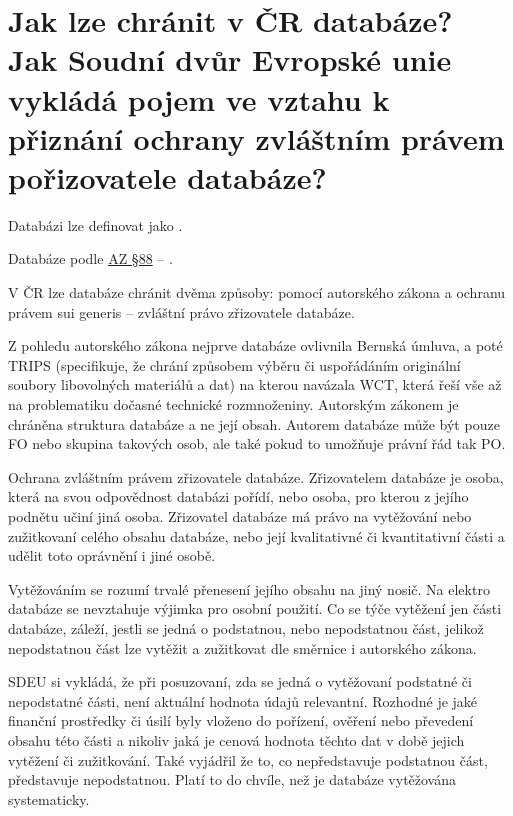 \section{Jak lze chránit v ČR databáze? Jak Soudní dvůr Evropské unie vykládá pojem  ve vztahu k přiznání ochrany zvláštním právem pořizovatele databáze?}

Databázi lze definovat jako .

Databáze podle \href{https://www.zakonyprolidi.cz/cs/2000-121#p88}{AZ §88} -- .

V ČR lze databáze chránit dvěma způsoby: pomocí autorského zákona a ochranu právem sui generis -- zvláštní právo zřizovatele databáze.

Z pohledu autorského zákona nejprve databáze ovlivnila Bernská úmluva, a poté TRIPS (specifikuje, že chrání způsobem výběru či uspořádáním originální soubory libovolných materiálů a dat) na kterou navázala WCT, která řeší vše až na problematiku dočasné technické rozmnoženiny. Autorským zákonem je chráněna struktura databáze a ne její obsah. Autorem databáze může být pouze FO nebo skupina takových osob, ale také pokud to umožňuje právní řád tak PO\@.

Ochrana zvláštním právem zřizovatele databáze. Zřizovatelem databáze je osoba, která na svou odpovědnost databázi pořídí, nebo osoba, pro kterou z jejího podnětu učiní jiná osoba. Zřizovatel databáze má právo na vytěžování nebo zužitkovaní celého obsahu databáze, nebo její kvalitativné či kvantitativní části a udělit toto oprávnění i jiné osobě. 

Vytěžováním se rozumí trvalé přenesení jejího obsahu na jiný nosič. Na elektro databáze se nevztahuje výjimka pro osobní použití. Co se týče vytěžení jen části databáze, záleží, jestli se jedná o podstatnou, nebo nepodstatnou část, jelikož nepodstatnou část lze vytěžit a zužitkovat dle směrnice i autorského zákona.

SDEU si vykládá, že při posuzovaní, zda se jedná o vytěžovaní podstatné či nepodstatné části, není aktuální hodnota údajů relevantní. Rozhodné je jaké finanční prostředky či úsilí byly vloženo do pořízení, ověření nebo převedení obsahu této části a nikoliv jaká je cenová hodnota těchto dat v době jejich vytěžení či zužitkování. Také vyjádřil že to, co nepředstavuje podstatnou část, představuje nepodstatnou. Platí to do chvíle, než je databáze vytěžována systematicky.


